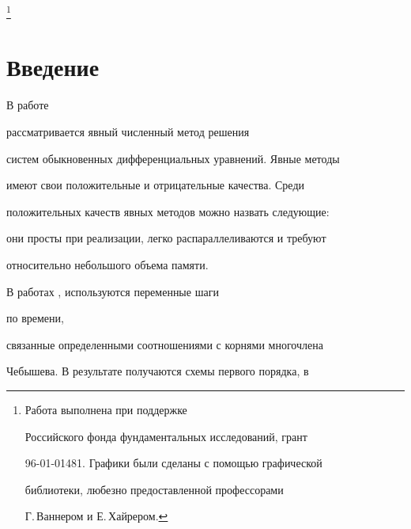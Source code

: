 \thanks{Работа выполнена при поддержке


Российского фонда фундаментальных исследований, грант


96-01-01481. Графики были сделаны с помощью графической


библиотеки, любезно предоставленной профессорами


Г.\,Ваннером  и Е.\,Хайрером.}


\date{}







\pagestyle{plain} %













\maketitle


\label{begin}





\section{Введение}





В работе


рассматривается явный численный метод решения


систем обыкновенных дифференциальных уравнений. Явные методы


имеют свои положительные и отрицательные качества. Среди


положительных качеств явных методов можно назвать следующие:


они просты при реализации, легко распараллеливаются и требуют


относительно небольшого объема памяти.


В работах \cite{5}, \cite{6} используются переменные шаги


по времени,


связанные определенными соотношениями с корнями многочлена


Чебышева. В результате получаются схемы первого порядка, в


